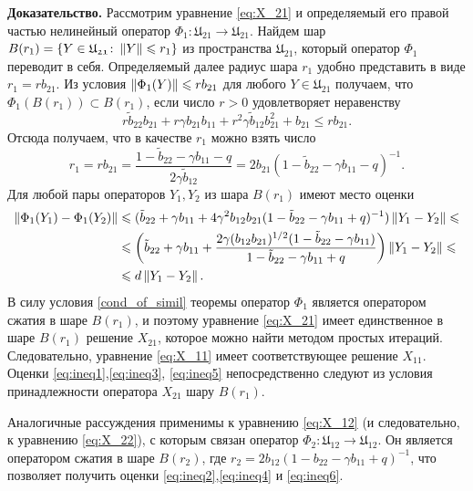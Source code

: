 \textbf{Доказательство.}
Рассмотрим уравнение \eqref{eq:X_21} и определяемый его правой частью нелинейный оператор $ \Phi_1 \colon \mathfrak{U_{21}} \to \mathfrak{U_{21}}$. Найдем шар 
$B(r_1) = \left\{ Y \in \mathfrak{U_{21}}\colon \left\|Y\right\| \leqslant r_1 \right\}$ из пространства $\mathfrak{U_{21}}$, который оператор $\Phi_1$ переводит в себя. Определяемый далее радиус шара 
$r_1$ удобно представить в виде $r_1 = r b_{21}$. Из условия $\left\|\Phi_1(Y)\right\| \leqslant r b_{21}$ для любого $Y \in \mathfrak{U_{21}}$ получаем, что $\Phi_1(B(r_1)) \subset B(r_1)$, если число 
$r>0$ удовлетворяет неравенству
\begin{equation*}
	r \tilde b_{22} b_{21} + r\gamma b_{21} b_{11} + r^2\gamma \tilde b_{12} b_{21}^2 + b_{21} \leqslant r b_{21}.
\end{equation*}
Отсюда получаем, что в качестве $r_1$ можно взять число 
\begin{equation*}
	r_1 = r b_{21} = \frac{1 - \tilde b_{22} - \gamma b_{11} - q}{2\gamma \tilde b_{12}} = 2 b_{21}(1 - \tilde b_{22} - \gamma b_{11} - q)^{-1}.
\end{equation*}
Для любой пары операторов $Y_1,Y_2$ из шара $B(r_1)$ имеют место оценки
\begin{equation*}
	\begin{split}
		\left\|\Phi_1(Y_1) - \Phi_1(Y_2)\right\| &\leqslant (\tilde b_{22} + \gamma b_{11} + 4\gamma^2 b_{12} b_{21} (1 - \tilde b_{22} - \gamma b_{11} + q)^{-1})\left\|Y_1 - Y_2\right\| \leqslant \\
		&\leqslant \left( \tilde b_{22} + \gamma b_{11} + \frac{2\gamma(b_{12}b_{21})^{1/2} (1 - \tilde b_{22} -\gamma b_{11})}{1 - \tilde b_{22} - \gamma b_{11} + q} \right) \left\|Y_1 - Y_2\right\| \leqslant \\
		&\leqslant d\left\|Y_1 - Y_2\right\|.
	\end{split}
\end{equation*}
В силу условия \eqref{cond_of_simil} теоремы оператор $\Phi_1$ является оператором сжатия в шаре $B(r_1)$, и поэтому уравнение \eqref{eq:X_21} имеет единственное в шаре $B(r_1)$ решение 
$X_{21}$, которое можно найти методом простых итераций. Следовательно, уравнение \eqref{eq:X_11} имеет соответствующее решение $X_{11}$. Оценки \eqref{eq:ineq1},\eqref{eq:ineq3},
\eqref{eq:ineq5} непосредственно следуют из условия принадлежности оператора $X_{21}$ шару $B(r_1)$.

Аналогичные рассуждения применимы к уравнению \eqref{eq:X_12} (и следовательно, к уравнению \eqref{eq:X_22}), с которым связан оператор $\Phi_2 \colon \mathfrak{U_{12}} \to \mathfrak{U_{12}}$.
Он является оператором сжатия в шаре $B(r_2)$, где $r_2 = 2b_{12}(1 - b_{22} - \gamma b_{11} + q)^{-1}$, что позволяет получить оценки \eqref{eq:ineq2},\eqref{eq:ineq4} и 
\eqref{eq:ineq6}.

